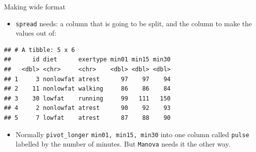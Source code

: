 \documentclass[ignorenonframetext,]{beamer}
\newenvironment{Shaded}{\begin{snugshade}}{\end{snugshade}}
\newcommand{\DataTypeTok}[1]{\textcolor[rgb]{0.13,0.29,0.53}{#1}}
\newcommand{\DecValTok}[1]{\textcolor[rgb]{0.00,0.00,0.81}{#1}}
\newcommand{\KeywordTok}[1]{\textcolor[rgb]{0.13,0.29,0.53}{\textbf{#1}}}
\newcommand{\NormalTok}[1]{#1}
\newcommand{\OperatorTok}[1]{\textcolor[rgb]{0.81,0.36,0.00}{\textbf{#1}}}
\newcommand{\StringTok}[1]{\textcolor[rgb]{0.31,0.60,0.02}{#1}}
\providecommand{\tightlist}{%
  \setlength{\itemsep}{0pt}\setlength{\parskip}{0pt}}
\begin{document}
\begin{frame}[fragile]{Making wide format}
\protect\hypertarget{making-wide-format}{}

\begin{itemize}
\tightlist
\item
  \texttt{spread} needs: a column that is going to be split, and the
  column to make the values out of:
\end{itemize}

\footnotesize

\begin{Shaded}
\end{Shaded}

\begin{verbatim}
## # A tibble: 5 x 6
##      id diet      exertype min01 min15 min30
##   <dbl> <chr>     <chr>    <dbl> <dbl> <dbl>
## 1     3 nonlowfat atrest      97    97    94
## 2    11 nonlowfat walking     86    86    84
## 3    30 lowfat    running     99   111   150
## 4     2 nonlowfat atrest      90    92    93
## 5     7 lowfat    atrest      87    88    90
\end{verbatim}

\normalsize

\begin{itemize}
\tightlist
\item
  Normally \texttt{pivot\_longer} \texttt{min01, min15,
  min30} into one column called \texttt{pulse} labelled by the number of
  minutes. But \texttt{Manova} needs it the other way.
\end{itemize}

\end{frame}
\end{document}
